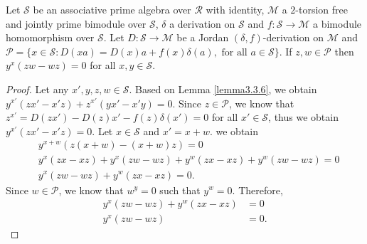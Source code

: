 \documentclass{arxiv}
\begin{document}
\begin{lemma}\label{lemma3.3.14}
    Let $\mathcal{S}$ be an associative prime algebra over $\mathcal{R}$ with identity, $\mathcal{M}$ a $2$-torsion free and jointly prime bimodule over $\mathcal{S}$, $\delta$ a derivation on $\mathcal{S}$ and $f : \mathcal{S} \rightarrow \mathcal{M}$ a bimodule homomorphism over $\mathcal{S}$. Let $D:\mathcal{S} \rightarrow \mathcal{M}$ be a Jordan $(\delta,f)$-derivation on $\mathcal{M}$ and $\mathcal{P}=\{ x \in \mathcal{S} : D(xa) = D(x)a+f(x)\delta(a), \text{ for all } a \in \mathcal{S}\}$. If $z,w \in \mathcal{P}$ then $y^x (zw-wz)=0$ for all $x,y \in \mathcal{S}$.
\end{lemma}
\begin{proof}
    Let any $x',y,z,w \in \mathcal{S}$. Based on Lemma \ref{lemma3.3.6}, we obtain $y^{x'}(zx'-x'z)+z^{x'}(yx'-x'y)=0$. Since $z \in \mathcal{P}$, we know that $z^{x'}=D(zx')-D(z)x'-f(z)\delta(x')=0$ for all $x' \in \mathcal{S}$, thus we obtain $y^{x'}(zx'-x'z)=0$. Let $x \in \mathcal{S}$ and $x'=x+w$. we obtain
    \begin{align*}
        &y^{x+w}(z(x+w)-(x+w)z) =0\\
        & y^x (zx-xz)+y^x(zw-wz)+y^w(zx-xz)+y^w(zw-wz)=0\\
        &y^x (zw-wz) + y^w (zx-xz) = 0.
    \end{align*}
    Since $w \in \mathcal{P}$, we know that $w^y = 0$ such that $y^w = 0$. Therefore,
    \begin{align*}
        y^x (zw-wz) + y^w (zx-xz) &= 0\\
        y^x (zw-wz) &= 0.
    \end{align*}
\end{proof}
\end{document}
